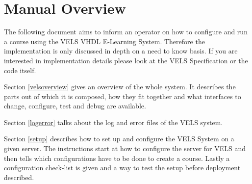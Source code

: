 \section{Manual Overview}

The following document aims to inform an operator on how to configure and run a course
using the VELS VHDL E-Learning System. Therefore the implementation is only discussed
in depth on a need to know basis. If you are interested in implementation details please
look at the VELS Specification or the code itself.

Section \ref{velsoverview} gives an overview of the whole system. It describes the parts
out of which it is composed, how they fit together and what interfaces to change,
configure, test and debug are available.

Section \ref{logerror} talks about the log and error files of the VELS system.

Section \ref{setup} describes how to set up and configure the VELS System on a given
server. The instructions start at how to configure the server for VELS and then tells
which configurations have to be done to create a course. Lastly a configuration check-list
is given and a way to test the setup before deployment described.

